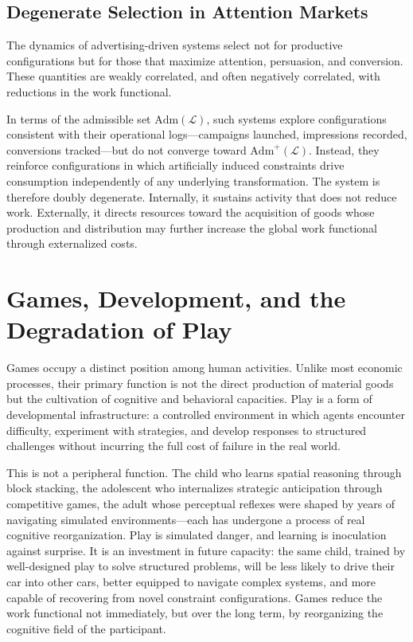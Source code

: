 \documentclass[12pt, oneside]{article}
\theoremstyle{definition}
\newcommand{\Log}{\mathcal{L}}
\newcommand{\Admit}{\mathrm{Adm}}
\begin{document}
\subsection{Degenerate Selection in Attention Markets}

The dynamics of advertising-driven systems select not for productive configurations but for those that maximize attention, persuasion, and conversion. These quantities are weakly correlated, and often negatively correlated, with reductions in the work functional.

In terms of the admissible set $\Admit(\Log)$, such systems explore configurations consistent with their operational logs---campaigns launched, impressions recorded, conversions tracked---but do not converge toward $\Admit^+(\Log)$. Instead, they reinforce configurations in which artificially induced constraints drive consumption independently of any underlying transformation. The system is therefore doubly degenerate. Internally, it sustains activity that does not reduce work. Externally, it directs resources toward the acquisition of goods whose production and distribution may further increase the global work functional through externalized costs.

\section{Games, Development, and the Degradation of Play}

Games occupy a distinct position among human activities. Unlike most economic processes, their primary function is not the direct production of material goods but the cultivation of cognitive and behavioral capacities. Play is a form of developmental infrastructure: a controlled environment in which agents encounter difficulty, experiment with strategies, and develop responses to structured challenges without incurring the full cost of failure in the real world.

This is not a peripheral function. The child who learns spatial reasoning through block stacking, the adolescent who internalizes strategic anticipation through competitive games, the adult whose perceptual reflexes were shaped by years of navigating simulated environments---each has undergone a process of real cognitive reorganization. Play is simulated danger, and learning is inoculation against surprise. It is an investment in future capacity: the same child, trained by well-designed play to solve structured problems, will be less likely to drive their car into other cars, better equipped to navigate complex systems, and more capable of recovering from novel constraint configurations. Games reduce the work functional not immediately, but over the long term, by reorganizing the cognitive field of the participant.
\end{document}
